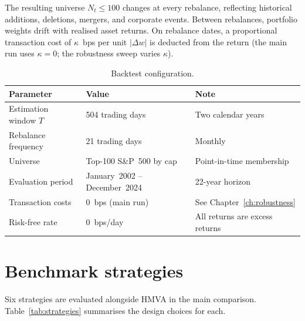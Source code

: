 \documentclass[a4paper,12pt]{report}
\begin{document}
The resulting universe $N_t \leq 100$ changes at every rebalance, reflecting
historical additions, deletions, mergers, and corporate events. Between
rebalances, portfolio weights drift with realised asset returns. On rebalance
dates, a proportional transaction cost of $\kappa$~bps per unit $|\Delta w|$
is deducted from the return (the main run uses $\kappa = 0$; the robustness
sweep varies $\kappa$).

\begin{table}[H]
  \centering
  \caption{Backtest configuration.}
  \label{tab:data-config}
  \begin{tabular}{@{}lll@{}}
    \toprule
    Parameter & Value & Note \\
    \midrule
    Estimation window $T$ & 504 trading days & Two calendar years \\
    Rebalance frequency & 21 trading days & Monthly \\
    Universe & Top-100 S\&P~500 by cap & Point-in-time membership \\
    Evaluation period & January~2002 -- December~2024 & 22-year horizon \\
    Transaction costs & 0~bps (main run) & See Chapter~\ref{ch:robustness} \\
    Risk-free rate & 0~bps/day & All returns are excess returns \\
    \bottomrule
  \end{tabular}
\end{table}

\section{Benchmark strategies}
\label{sec:data-strategies}

Six strategies are evaluated alongside HMVA in the main comparison.
Table~\ref{tab:strategies} summarises the design choices for each.
\end{document}
